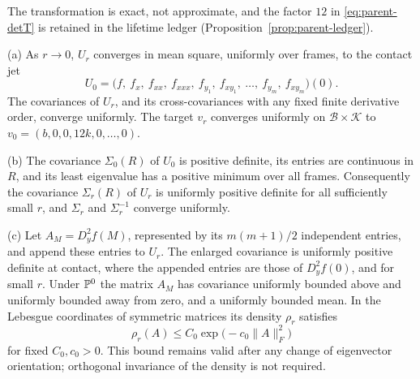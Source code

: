 The transformation is exact, not approximate, and the factor $12$ in \eqref{eq:parent-detT} is retained in the lifetime ledger (Proposition~\ref{prop:parent-ledger}).

\begin{lemma}\label{lem:parent-contact}
\textup{(a)} As $r\to0$, $U_r$ converges in mean square, uniformly over frames, to the contact jet
\begin{equation}\label{eq:parent-U0}
U_0=\bigl(f,\ f_x,\ f_{xx},\ f_{xxx},\ f_{y_1},\ f_{xy_1},\ \dots,\ f_{y_m},\ f_{xy_m}\bigr)(0).
\end{equation}
The covariances of $U_r$, and its cross-covariances with any fixed finite derivative order, converge uniformly. The target $v_r$ converges uniformly on $\mathcal B\times\mathcal K$ to $v_0=(b,0,0,12k,0,\dots,0)$.

\textup{(b)} The covariance $\Sigma_0(R)$ of $U_0$ is positive definite, its entries are continuous in $R$, and its least eigenvalue has a positive minimum over all frames. Consequently the covariance $\Sigma_r(R)$ of $U_r$ is uniformly positive definite for all sufficiently small $r$, and $\Sigma_r$ and $\Sigma_r^{-1}$ converge uniformly.

\textup{(c)} Let $A_M=D_y^2f(M)$, represented by its $m(m+1)/2$ independent entries, and append these entries to $U_r$. The enlarged covariance is uniformly positive definite at contact, where the appended entries are those of $D_y^2f(0)$, and for small $r$. Under $\mathbb P^0$ the matrix $A_M$ has covariance uniformly bounded above and uniformly bounded away from zero, and a uniformly bounded mean. In the Lebesgue coordinates of symmetric matrices its density $\rho_r$ satisfies
\begin{equation}\label{eq:parent-Adens}
\rho_r(A)\le C_0\exp\bigl(-c_0\|A\|_F^2\bigr)
\end{equation}
for fixed $C_0,c_0>0$. This bound remains valid after any change of eigenvector orientation; orthogonal invariance of the density is not required.
\end{lemma}

